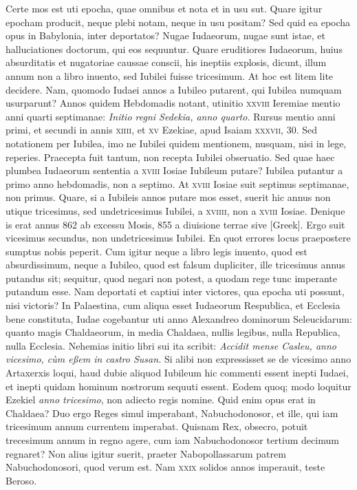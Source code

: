 Certe mos est uti epocha, quae omnibus et nota et in usu sut.
Quare
igitur epocham producit, neque plebi notam, neque in usu positam?
Sed quid ea epocha opus in Babylonia, inter deportatos?
Nugae Iudaeorum,
nugae sunt istae, et halluciationes doctorum, qui eos sequuntur.
Quare eruditiores Iudaeorum, huius absurditatis et nugatoriae
caussae conscii, his ineptiis explosis, dicunt, illum annum non a
libro inuento, sed Iubilei fuisse tricesimum.
At hoc est litem lite decidere.
Nam, quomodo Iudaei annos a Iubileo putarent, qui Iubilea
numquam usurparunt?
Annos quidem Hebdomadis notant, utinitio
\textsc{xxviii} Ieremiae mentio anni quarti septimanae: \textit{Initio regni
Sedekia, anno quarto.}
Rursus mentio anni primi, et secundi in annis
\textsc{xiiii}, et \textsc{xv} Ezekiae, apud Isaiam \textsc{xxxvii}, 30.
Sed notationem
per Iubilea, imo ne Iubilei quidem mentionem, nusquam, nisi
in lege, reperies.
Praecepta fuit tantum, non recepta Iubilei obseruatio.
Sed quae haec plumbea Iudaeorum sententia a \textsc{xviii} Iosiae
Iubileum putare?
Iubilea putantur a primo anno hebdomadis, non
a septimo.
At \textsc{xviii} Iosiae suit septimus septimanae, non primus.
Quare, si a Iubileis annos putare mos esset, suerit hic annus non utique
tricesimus, sed undetricesimus Iubilei, a \textsc{xviiii}, non a
\textsc{xviii} Iosiae.
Denique is erat annus 862 ab excessu Mosis, 855 a
diuisione terrae sive \textgreek{[Greek]}.
Ergo suit vicesimus secundus, non
undetricesimus Iubilei.
En quot errores locus praepostere sumptus
nobis peperit.
Cum igitur neque a libro legis inuento, quod est absurdissimum,
neque a Iubileo, quod est falsum dupliciter, ille tricesimus
annus putandus sit; sequitur, quod negari non potest, a
quodam rege tunc imperante putandum esse.
Nam deportati et captiui
inter victores, qua epocha uti possunt, nisi victoris?
In Palaestina,
cum aliqua esset Iudaeorum Respublica, et Ecclesia bene constituta,
Iudae cogebantur uti anno Alexandreo dominorum Seleucidarum:
quanto magis Chaldaeorum, in media Chaldaea, nullis legibus,
nulla Republica, nulla Ecclesia.
Nehemias initio libri sui ita
scribit: \textit{Accidit mense Casleu, anno vicesimo, cùm eßem in castro Susan.}
Si alibi non expressisset se de vicesimo anno Artaxerxis loqui, haud
dubie aliquod Iubileum hic commenti essent inepti Iudaei, et inepti
quidam hominum nostrorum sequuti essent.
Eodem quoq; modo
loquitur Ezekiel \textit{anno tricesimo}, non adiecto regis nomine.
Quid enim opus erat in Chaldaea?
Duo ergo Reges simul imperabant,
Nabuchodonosor, et ille, qui iam tricesimum annum currentem
imperabat.
Quisnam Rex, obsecro, potuit trecesimum annum in regno
agere, cum iam Nabuchodonosor tertium decimum regnaret?
Non alius igitur suerit, praeter Nabopollassarum patrem Nabuchodonosori,
quod verum est.
{}
Nam \textsc{xxix} solidos annos imperauit,
teste Beroso.

